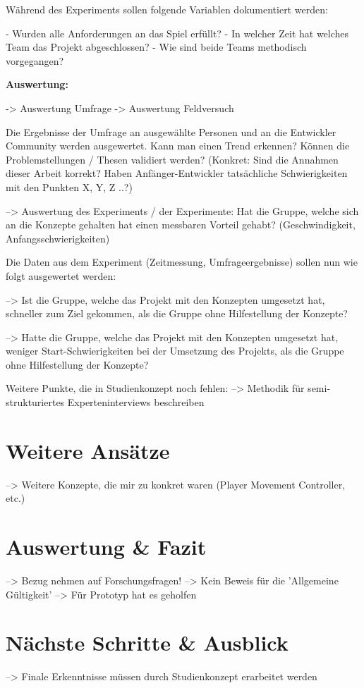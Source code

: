 Während des Experiments sollen folgende Variablen dokumentiert werden:

- Wurden alle Anforderungen an das Spiel erfüllt?
- In welcher Zeit hat welches Team das Projekt abgeschlossen?
- Wie sind beide Teams methodisch vorgegangen?

\textbf{Auswertung:}

-> Auswertung Umfrage
-> Auswertung Feldversuch

Die Ergebnisse der Umfrage an ausgewählte Personen und an die Entwickler Community werden ausgewertet. Kann man einen Trend erkennen? Können die Problemstellungen / Thesen validiert werden? 
(Konkret: Sind die Annahmen dieser Arbeit korrekt? Haben Anfänger-Entwickler tatsächliche Schwierigkeiten mit den Punkten X, Y, Z ..?)

--> Auswertung des Experiments / der Experimente: Hat die Gruppe, welche sich an die Konzepte gehalten hat einen messbaren Vorteil gehabt? (Geschwindigkeit, Anfangsschwierigkeiten)

Die Daten aus dem Experiment (Zeitmessung, Umfrageergebnisse) sollen nun wie folgt ausgewertet werden:

--> Ist die Gruppe, welche das Projekt mit den Konzepten umgesetzt hat, schneller zum Ziel gekommen, als die Gruppe ohne Hilfestellung der Konzepte?

--> Hatte die Gruppe, welche das Projekt mit den Konzepten umgesetzt hat, weniger Start-Schwierigkeiten bei der Umsetzung des Projekts, als die Gruppe ohne Hilfestellung der Konzepte?


Weitere Punkte, die in Studienkonzept noch fehlen:
--> Methodik für semi-strukturiertes Experteninterviews beschreiben

\section{Weitere Ansätze}

--> Weitere Konzepte, die mir zu konkret waren (Player Movement Controller, etc.)

\section{Auswertung \& Fazit}

--> Bezug nehmen auf Forschungsfragen!
--> Kein Beweis für die 'Allgemeine Gültigkeit'
--> Für Prototyp hat es geholfen

\section{Nächste Schritte \& Ausblick}

--> Finale Erkenntnisse müssen durch Studienkonzept erarbeitet werden